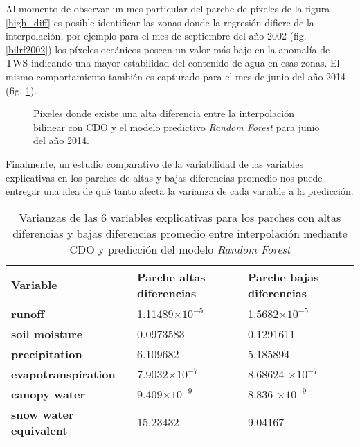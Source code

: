 Al momento de observar un mes particular del parche de píxeles de la figura \ref{high_diff} es posible identificar las zonas donde la regresión difiere de la interpolación, por ejemplo para el mes de septiembre del año 2002 (fig. \ref{bilrf2002})
los píxeles oceánicos poseen un valor más bajo en la anomalía de TWS indicando una mayor estabilidad del contenido de agua en esas zonas. El mismo comportamiento también es capturado para el mes de junio del año 2014 (fig. \ref{bilrf2014}).

\begin{figure}[H]
    \centering
          \vskip -0.1in
    \caption[Área donde la interpolación bilinear y el modelo predictivo difieren en el periodo 06/2014]{Píxeles donde existe una alta diferencia entre la interpolación bilinear con CDO y el modelo predictivo \textit{Random Forest} para junio del año 2014.}
    \label{bilrf2014}
\end{figure}

Finalmente, un estudio comparativo de la variabilidad de las variables explicativas en los parches de altas y bajas diferencias promedio nos puede entregar 
una idea de qué tanto afecta la varianza de cada variable a la predicción. 
\begin{table}[H] 
    \caption[Varianzas de las variables explicativas de RF]{Varianzas de las 6 variables explicativas para los parches con altas diferencias y bajas diferencias promedio entre interpolación mediante CDO y predicción del modelo \textit{Random Forest}}
    \begin{tabularx}{0.9\textwidth}{CCC}
    \toprule
    \textbf{Variable}	& \textbf{Parche altas diferencias}	& \textbf{Parche bajas diferencias} \\
        \midrule
        \textbf{runoff}		                 & 1.11489$\times 10^{-5}$  & 1.5682$\times 10^{-5}$  \\
        \textbf{soil moisture}		         & 0.0973583                & 0.1291611\\
        \textbf{precipitation}		         & 6.109682                 & 5.185894\\
        \textbf{evapotranspiration}	         & 7.9032$\times 10^{-7}$   & 8.68624 $\times 10^{-7}$\\
        \textbf{canopy water}		         & 9.409$\times 10^{-9}$    & 8.836 $\times 10^{-9}$\\
        \textbf{snow water equivalent}	     & 15.23432                 & 9.04167 \\
        \bottomrule
    \end{tabularx}
\end{table}


